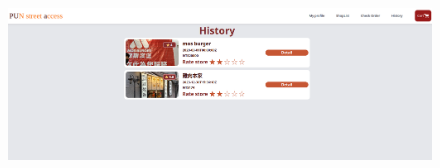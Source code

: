 \documentclass[a4paper, 12pt]{article}
\begin{document}
\newline
{}
\begin{figure}[hp]
    \centerline{\includegraphics[width=40em]{gui-snapshot/customer/history.png}}
    \label{fig:enter-label}
\end{figure}
\newline
\newpage
\end{document}
